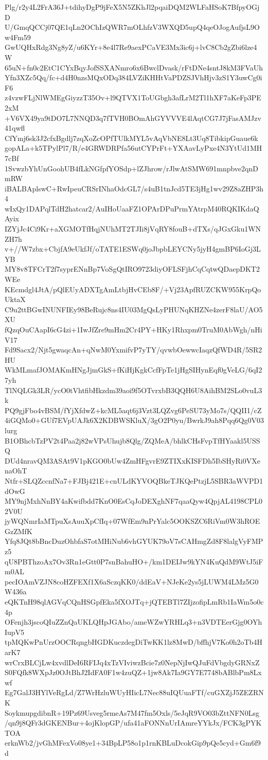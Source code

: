 Plg/r2y4L2FrA36J+tdihyDgP9jFeX5N5ZKhJl2pqaiDQM2WLFaHSoK7BfpyOGjD
U/GmqQCCj07QE1qLn2OChIzQWR7mOLhfzV3WXQD5upQ4qeOJogAufjsL9Ow4Fm59
GwUQHxRdg3Ng8yZ/u6KYr+8e4l7Re9aexPCaVE3Mx3ic6j+lvC8Cb2gZbi6lze4W
65uN+fn0c2EtC1CYxBqyJofSSXANmro6x6BwclDvask/rFtDNe4sntJ8kM3FVaUh
Yfn3XZc5Qq/fc+d4H0nzsMQxODq384LVZiKHHtVaPDZSJVhHjv3zS1Y3uwCg0iF6
z4vzwFLjNlWMEgGiyzzT35Ov+l9QTVX1ToUGbgh3afLrM2Tl1hXF7aKeFp3PE2xM
+V6VX49ya9tDO7L7NNQD3q7fTVH0BOmAhGYVVVE4lAqtCG7J7jFasAMJzv41qwfl
CfYmj6sk3J2cfxBgdlj7zqXoZcOPfTUlkMYL5vAqVbNE8Lt3Uq8TibkipGuaue6k
gopALa+k5TPylPl7/R/e4GRWDRPfa56utCYPrFt+YXAavLyPxe4N3YtUd1MH7cBf
1SvwzbYhUnGoohUB4fLkNGfpfYOSdp+lZJhrow/rJlwAtSMW691mnpbve2qnDmRW
iBALBAplswC+RwIpeuCRSrINhaOdcGL7/s4uB1tnJcd5TE3jHg1wv29Z8aZHP3h4
wIxQy1DAPqlTdH2hatcar2/AuIHoUaaFZ1OPArDPuPrmYAtrpM40RQKIKdaQAyix
IZYjJc4Ci9Kr+aXGMOTfHqjNUhMT2TJIi8jVqRY8fouB+dTXs/qJGxGku1WNZH7h
v+//W7zbx+CbjfA9eUkfJf/oTATE1ESWq0joJbpbLEYCNy5jyH4gmBP6IoGj3LYB
MY8v8TFCrT2f7syprENnBp7VoSgQtIRO9723diyOFLSFjhCqCqtwQDaepDKT2WEe
KEcmdgl4JtA/pQlEUyADXTgAmLtbjHvCEb8F/+Vj23ApfRUZCKW955KrpQoUktaX
C9u2ttBGwINUNFIEy98BeRujc8ns4IU03MgQsLyPHUNqKHZNe4zerF8laU/AO5XU
fQzqOuCAapI6cG4zi+1IwJfZre9mHm2Cr4PY+HKy1Rhxpm0TruM0AbWgh/nHiV17
Fd9Sacx2/Njt5gwaqcAn+qNwM0YxmifvP7yTY/qvwbOewwcIaqzQfWD4R/5SR2HU
WkMLmafJOMAKmHNgJjmGkS+fKiHjKgkCcfFpTe1jHgSIHynEqf0gVeLG/6qI27yh
TlNQLGk3LR/ycO0tVhtfibHkzdm39aoi9f5OTvrxbB3QQH6U8AihBM2SLo0vuL3k
PQ9gjFbo4vBSM/fYjXfdwZ+kcML5aqt6j3Vzt3LQZvg6PeSU73yMo7s/QQII1/cZ
4iGQMo0+GUf7EVpUAJk6X2KDBWSKluX/3gO2P0yu/BwrkJ9ah8Pqq6Qg0V03lurg
B1OBhcbTzPV2t4Paa2j82wVPsUhujb8Qlg/ZQMeA/bhlkCHsFvpTfHYaakl5USSQ
DUd4nravQM3ASAt9V1pKGO0bUw4ZmHFgvrE9ZTIXxKISFDh5IbSHyRi0VXenaOhT
Ntfr+SLQZccnfNa7+FJBj421E+cnULdKYVOQBkeTJKQePtzjL5SBR3aWVPD1dOwG
MY9njMxhNnBY4aKwifbdd7KnO0EsCqJoDEXghNF7qaaQyw4QpjAL4198CPL02V0U
jyWQNmrIaMTpuXsAuuXpCfIq+07WfEm9nPrYalc5OOKSZC6RiVm0W3hROEGzZMfK
Yfq8JQt8bBncDuzOhbfaS7otMHiNub6vhGYUK79oV7sCAHmgZd8F8lalgVyFMPz5
qU8PBThzoAx7Ov3Rn1eGtt0P7snBahuHO+/km1DEIJw9kYN4KuQdM9WtJ5iFm0AL
pecIOAmVZJN8coHZFEXf1X6aSczqKK0/ddEaV+NJeKe2ys5jLUWM4LMz5G0W436a
eQKTnH98qlAGVqCQnHSGpfEka5fXOJTq+jQTEBTl7ZIjzofipLmRb1IaWm5o0c4p
OFenjh3jscoQIuZZnQaUKLQHpJGAbo/ameWZwYRHLq3+n3VDTEerGjg0OYhIupV5
tpMQKwPnUrzOOCRqngbHGDKuczdegDiTwKK1lz8MwD/bffhjV7Ko0h2oTb4HarK7
wrCrxBLCjLw4xvdlDeI6RFIJq4xTzVIviwzBcie7z0NepNjIwQJuFdVbgdyGRNxZ
S0FQfk8WXpJz0OJtBhJ2IdFA0F1w4zuQZ+1jw8Ak7Ia9GY7E7748bABlbPm8Lxwf
Eg7GalJ3HYlVeRgLd/Z7WrHzluWUyHIicL7Nec88uIQUuaFTf/cuGXZjJ5ZEZRNK
SoykmupgdibnR+19Pz69Usveg5rmeAs7M47fm5Oxls/5eJqR9VO03bZttNFN0Lsg
/qn9j8QFr3dGKENBur+4ojKlopGP/ufa41aFONNnUrIAmreYYkJx/FCK3gPYKTOA
erknWb2/jvGhMFexVo08ye1+34BpLP58o1p1rnKBLuDcokGip9pQe5cyd+Gm6f9d
